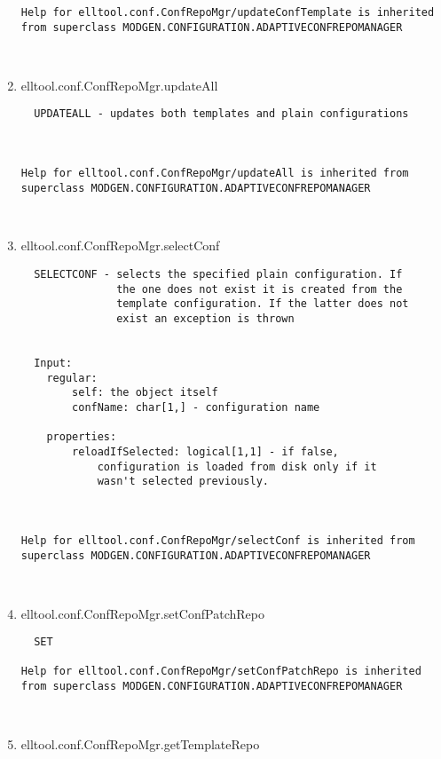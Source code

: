 \begin{enumerate}
\begin{lstlisting}
Help for elltool.conf.ConfRepoMgr/updateConfTemplate is inherited from superclass MODGEN.CONFIGURATION.ADAPTIVECONFREPOMANAGER



\end{lstlisting}
\fontfamily{\familydefault}
\selectfont
\item {elltool.conf.ConfRepoMgr.updateAll}
\selectfont
\begin{lstlisting}
  UPDATEALL - updates both templates and plain configurations



Help for elltool.conf.ConfRepoMgr/updateAll is inherited from superclass MODGEN.CONFIGURATION.ADAPTIVECONFREPOMANAGER



\end{lstlisting}
\fontfamily{\familydefault}
\selectfont
\item {elltool.conf.ConfRepoMgr.selectConf}
\selectfont
\begin{lstlisting}
  SELECTCONF - selects the specified plain configuration. If
               the one does not exist it is created from the
               template configuration. If the latter does not
               exist an exception is thrown


  Input:
    regular:
        self: the object itself
        confName: char[1,] - configuration name

    properties:
        reloadIfSelected: logical[1,1] - if false,
            configuration is loaded from disk only if it
            wasn't selected previously.



Help for elltool.conf.ConfRepoMgr/selectConf is inherited from superclass MODGEN.CONFIGURATION.ADAPTIVECONFREPOMANAGER



\end{lstlisting}
\fontfamily{\familydefault}
\selectfont
\item {elltool.conf.ConfRepoMgr.setConfPatchRepo}
\selectfont
\begin{lstlisting}
  SET

Help for elltool.conf.ConfRepoMgr/setConfPatchRepo is inherited from superclass MODGEN.CONFIGURATION.ADAPTIVECONFREPOMANAGER



\end{lstlisting}
\fontfamily{\familydefault}
\selectfont
\item {elltool.conf.ConfRepoMgr.getTemplateRepo}
\selectfont
\begin{lstlisting}




\end{lstlisting}
\end{enumerate}

